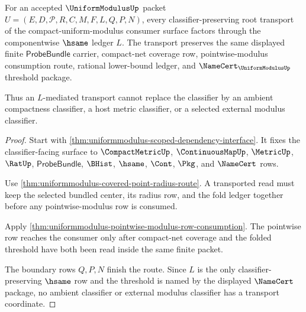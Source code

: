 \begin{theorem}
\label{thm:uniformmodulus-root-classifier-transport-row}
For an accepted $\UniformModulusUp$ packet $U=(E,D,\mathcal{P},R,C,M,F,L,Q,P,N)$, every classifier-preserving root transport of the compact-uniform-modulus consumer surface factors through the componentwise $\hsame$ ledger $L$. The transport preserves the same displayed finite $\mathsf{ProbeBundle}$ carrier, compact-net coverage row, pointwise-modulus consumption route, rational lower-bound ledger, and $\NameCert_{\UniformModulusUp}$ threshold package.

Thus an $L$-mediated transport cannot replace the classifier by an ambient compactness classifier, a host metric classifier, or a selected external modulus classifier.
\end{theorem}
\begin{proof}
Start with \autoref{thm:uniformmodulus-scoped-dependency-interface}. It fixes the classifier-facing surface to $\CompactMetricUp$, $\ContinuousMapUp$, $\MetricUp$, $\RatUp$, $\mathsf{ProbeBundle}$, $\BHist$, $\hsame$, $\Cont$, $\Pkg$, and $\NameCert$ rows.

Use \autoref{thm:uniformmodulus-covered-point-radius-route}. A transported read must keep the selected bundled center, its radius row, and the fold ledger together before any pointwise-modulus row is consumed.

Apply \autoref{thm:uniformmodulus-pointwise-modulus-row-consumption}. The pointwise row reaches the consumer only after compact-net coverage and the folded threshold have both been read inside the same finite packet.

The boundary rows $Q,P,N$ finish the route. Since $L$ is the only classifier-preserving $\hsame$ row and the threshold is named by the displayed $\NameCert$ package, no ambient classifier or external modulus classifier has a transport coordinate.
\end{proof}

